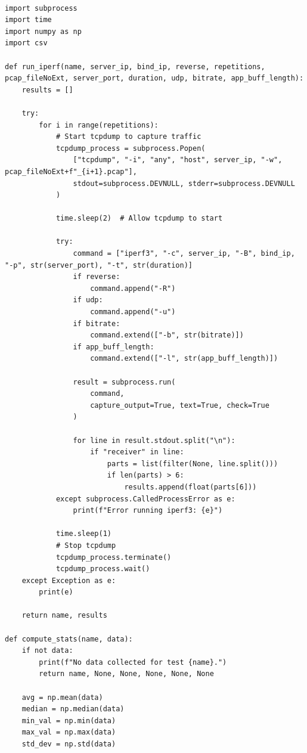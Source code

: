 \hfill\\

\begin{verbatim}
import subprocess
import time
import numpy as np
import csv

def run_iperf(name, server_ip, bind_ip, reverse, repetitions, pcap_fileNoExt, server_port, duration, udp, bitrate, app_buff_length):
    results = []
        
    try:
        for i in range(repetitions):
            # Start tcpdump to capture traffic
            tcpdump_process = subprocess.Popen(
                ["tcpdump", "-i", "any", "host", server_ip, "-w", pcap_fileNoExt+f"_{i+1}.pcap"],
                stdout=subprocess.DEVNULL, stderr=subprocess.DEVNULL
            )
            
            time.sleep(2)  # Allow tcpdump to start
            
            try:
                command = ["iperf3", "-c", server_ip, "-B", bind_ip, "-p", str(server_port), "-t", str(duration)]
                if reverse:
                    command.append("-R")
                if udp:
                    command.append("-u")
                if bitrate:
                    command.extend(["-b", str(bitrate)])
                if app_buff_length:
                    command.extend(["-l", str(app_buff_length)])
                
                result = subprocess.run(
                    command,
                    capture_output=True, text=True, check=True
                )
                
                for line in result.stdout.split("\n"):
                    if "receiver" in line:
                        parts = list(filter(None, line.split()))
                        if len(parts) > 6:
                            results.append(float(parts[6]))
            except subprocess.CalledProcessError as e:
                print(f"Error running iperf3: {e}")
            
            time.sleep(1)
            # Stop tcpdump
            tcpdump_process.terminate()
            tcpdump_process.wait()
    except Exception as e:
        print(e)

    return name, results

def compute_stats(name, data):
    if not data:
        print(f"No data collected for test {name}.")
        return name, None, None, None, None, None
    
    avg = np.mean(data)
    median = np.median(data)
    min_val = np.min(data)
    max_val = np.max(data)
    std_dev = np.std(data)
    

\end{verbatim}
